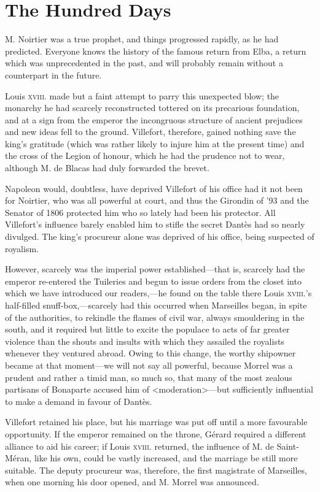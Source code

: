 \chapter{The Hundred Days} 
	
	\lettrine{M}{.} Noirtier was a true prophet, and things progressed rapidly, as he had predicted. Everyone knows the history of the famous return from Elba, a return which was unprecedented in the past, and will probably remain without a counterpart in the future. 

 Louis \textsc{xviii.} made but a faint attempt to parry this unexpected blow; the monarchy he had scarcely reconstructed tottered on its precarious foundation, and at a sign from the emperor the incongruous structure of ancient prejudices and new ideas fell to the ground. Villefort, therefore, gained nothing save the king's gratitude (which was rather likely to injure him at the present time) and the cross of the Legion of honour, which he had the prudence not to wear, although M. de Blacas had duly forwarded the brevet. 

 Napoleon would, doubtless, have deprived Villefort of his office had it not been for Noirtier, who was all powerful at court, and thus the Girondin of '93 and the Senator of 1806 protected him who so lately had been his protector. All Villefort's influence barely enabled him to stifle the secret Dantès had so nearly divulged. The king's procureur alone was deprived of his office, being suspected of royalism. 

 However, scarcely was the imperial power established—that is, scarcely had the emperor re-entered the Tuileries and begun to issue orders from the closet into which we have introduced our readers,—he found on the table there Louis \textsc{xviii.}'s half-filled snuff-box,—scarcely had this occurred when Marseilles began, in spite of the authorities, to rekindle the flames of civil war, always smouldering in the south, and it required but little to excite the populace to acts of far greater violence than the shouts and insults with which they assailed the royalists whenever they ventured abroad.  Owing to this change, the worthy shipowner became at that moment—we will not say all powerful, because Morrel was a prudent and rather a timid man, so much so, that many of the most zealous partisans of Bonaparte accused him of <moderation>—but sufficiently influential to make a demand in favour of Dantès. 

 Villefort retained his place, but his marriage was put off until a more favourable opportunity. If the emperor remained on the throne, Gérard required a different alliance to aid his career; if Louis \textsc{xviii.} returned, the influence of M. de Saint-Méran, like his own, could be vastly increased, and the marriage be still more suitable. The deputy procureur was, therefore, the first magistrate of Marseilles, when one morning his door opened, and M. Morrel was announced. 

